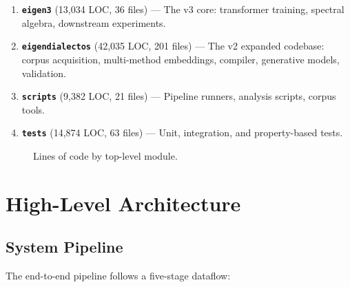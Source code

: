 \documentclass[11pt,a4paper]{article}
\begin{document}
\begin{enumerate}[nosep]
  \item \textbf{\texttt{eigen3}} (13{,}034 LOC, 36 files) --- The v3 core:
        transformer training, spectral algebra, downstream experiments.
  \item \textbf{\texttt{eigendialectos}} (42{,}035 LOC, 201 files) --- The v2
        expanded codebase: corpus acquisition, multi-method embeddings, compiler,
        generative models, validation.
  \item \textbf{\texttt{scripts}} (9{,}382 LOC, 21 files) --- Pipeline runners,
        analysis scripts, corpus tools.
  \item \textbf{\texttt{tests}} (14{,}874 LOC, 63 files) --- Unit, integration,
        and property-based tests.
\end{enumerate}

\begin{figure}[H]
\centering
{}
\caption{Lines of code by top-level module.}
\end{figure}


\section{High-Level Architecture}

\subsection{System Pipeline}

The end-to-end pipeline follows a five-stage dataflow:
\end{document}
